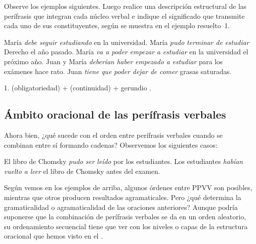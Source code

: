 \begin{ejercicio}\label{ej:11-cadenas}
Observe los ejemplos siguientes. Luego realice una descripción estructural de
las perífrasis que integran cada núcleo verbal e indique el significado que
transmite cada uno de sus constituyentes, según se muestra en el ejemplo
resuelto~1.

\begin{exe}
  \ex María \textit{debe seguir estudiando} en la universidad.
  \ex María \textit{pudo terminar de estudiar} Derecho el año pasado.
  \ex María \textit{va a poder empezar a estudiar} en la universidad el próximo
      año.
  \ex Juan y María \textit{deberían haber empezado a estudiar} para los exámenes
      hace rato.
  \ex Juan \textit{tiene que poder dejar de comer} grasas saturadas.
\end{exe}

\begin{resuelto}
1.  (obligatoriedad) +  (continuidad) + gerundio
.
\end{resuelto}
\end{ejercicio}

\subsection{Ámbito oracional de las perífrasis verbales}\label{sec:11-ambito}

Ahora bien, ¿qué sucede con el orden entre perífrasis verbales cuando se
combinan entre sí formando cadenas? Observemos los siguientes casos:

\begin{exe}
  \ex\label{ex:11-chomsky}
    \begin{xlist}
      \ex\label{ex:11-chomsky-b} El libro de Chomsky \textit{pudo ser leído} por
          los estudiantes.
      \ex\label{ex:11-chomsky-d} Los estudiantes \textit{habían vuelto a leer} el
          libro de Chomsky antes del examen.
    \end{xlist}
\end{exe}

Según vemos en los ejemplos de arriba, algunos órdenes entre PPVV son posibles,
mientras que otros producen resultados agramaticales. Pero ¿qué determina la
gramaticalidad o agramaticalidad de las oraciones anteriores? Aunque podría
suponerse que la combinación de perífrasis verbales se da en un orden aleatorio,
su ordenamiento secuencial tiene que ver con los niveles o capas de la estructura
oracional que hemos visto en el .


